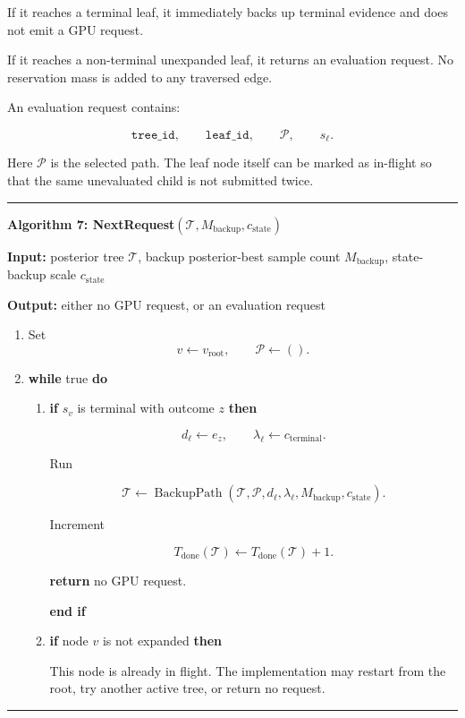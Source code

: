 \documentclass[11pt]{article}
\newcommand{\Tree}{\mathcal{T}}
\newcommand{\Path}{\mathcal{P}}
\newcommand{\BackupPath}{\operatorname{BackupPath}}
\newenvironment{algorithmblock}[1]
{
  \par\medskip
  \noindent\hrule\par\smallskip
  \noindent\textbf{#1}
  \par\smallskip
}
{
  \par\smallskip\noindent\hrule\par\medskip
}
\newcommand{\Input}{\textbf{Input: }}
\newcommand{\Output}{\textbf{Output: }}
\newcommand{\Return}{\textbf{return }}
\newcommand{\If}{\textbf{if }}
\newcommand{\Then}{\textbf{ then }}
\newcommand{\EndIf}{\textbf{end if}}
\newcommand{\While}{\textbf{while }}
\newcommand{\Do}{\textbf{ do }}
\begin{document}
If it reaches a terminal leaf, it immediately backs up terminal evidence and
does not emit a GPU request.

If it reaches a non-terminal unexpanded leaf, it returns an evaluation request.
No reservation mass is added to any traversed edge.

An evaluation request contains:

\[
\texttt{tree\_id},
\qquad
\texttt{leaf\_id},
\qquad
\Path,
\qquad
s_\ell.
\]

Here \(\Path\) is the selected path. The leaf node itself can be marked as
in-flight so that the same unevaluated child is not submitted twice.

\begin{algorithmblock}{Algorithm 7: NextRequest\((\Tree,M_{\mathrm{backup}},c_{\mathrm{state}})\)}

\Input posterior tree \(\Tree\), backup posterior-best sample count \(M_{\mathrm{backup}}\), state-backup scale \(c_{\mathrm{state}}\)

\Output either no GPU request, or an evaluation request

\begin{enumerate}[leftmargin=2em]
  \item Set
  \[
  v \gets v_{\mathrm{root}},
  \qquad
  \Path \gets ().
  \]

  \item \While true \Do

  \begin{enumerate}[leftmargin=2em]
    \item \If \(s_v\) is terminal with outcome \(z\) \Then

    \[
    d_\ell \gets e_z,
    \qquad
    \lambda_\ell \gets c_{\mathrm{terminal}}.
    \]

    Run

    \[
    \Tree \gets
    \BackupPath(\Tree,\Path,d_\ell,\lambda_\ell,M_{\mathrm{backup}},c_{\mathrm{state}}).
    \]

    Increment

    \[
    T_{\mathrm{done}}(\Tree)
    \gets
    T_{\mathrm{done}}(\Tree)+1.
    \]

    \Return no GPU request.

    \EndIf

    \item \If node \(v\) is not expanded \Then

    This node is already in flight. The implementation may restart from the
    root, try another active tree, or return no request.


\end{enumerate}
\end{enumerate}
\end{algorithmblock}
\end{document}
